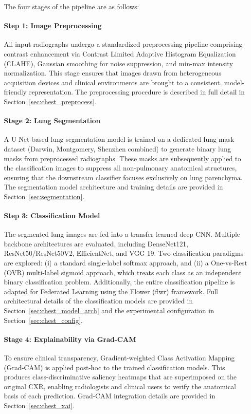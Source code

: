 The four stages of the pipeline are as follows:
\paragraph{Step 1: Image Preprocessing}
All input radiographs undergo a standardized preprocessing pipeline comprising contrast enhancement via Contrast Limited Adaptive Histogram Equalization (CLAHE), Gaussian smoothing for noise suppression, and min-max intensity normalization. This stage ensures that images drawn from heterogeneous acquisition devices and clinical environments are brought to a consistent, model-friendly representation. The preprocessing procedure is described in full detail in Section~\ref{sec:chest_preprocess}.

\paragraph{Stage 2: Lung Segmentation}
A U-Net-based lung segmentation model is trained on a dedicated lung mask dataset (Darwin, Montgomery, Shenzhen combined) to generate binary lung masks from preprocessed radiographs. These masks are subsequently applied to the classification images to suppress all non-pulmonary anatomical structures, ensuring that the downstream classifier focuses exclusively on lung parenchyma. The segmentation model architecture and training details are provided in Section~\ref{sec:segmentation}.

\paragraph{Step 3: Classification Model}
The segmented lung images are fed into a transfer-learned deep CNN. Multiple backbone architectures are evaluated, including DenseNet121, ResNet50/ResNet50V2, EfficientNet, and VGG-19. Two classification paradigms are explored: (i) a standard single-label softmax approach, and (ii) a One-vs-Rest (OVR) multi-label sigmoid approach, which treats each class as an independent binary classification problem. Additionally, the entire classification pipeline is adapted for Federated Learning using the Flower (flwr) framework. Full architectural details of the classification models are provided in Section~\ref{sec:chest_model_arch} and the experimental configuration in Section~\ref{sec:chest_config}.

\paragraph{Stage 4: Explainability via Grad-CAM}
To ensure clinical transparency, Gradient-weighted Class Activation Mapping (Grad-CAM) is applied post-hoc to the trained classification models. This produces class-discriminative saliency heatmaps that are superimposed on the original CXR, enabling radiologists and clinical users to verify the anatomical basis of each prediction. Grad-CAM integration details are provided in Section~\ref{sec:chest_xai}.

